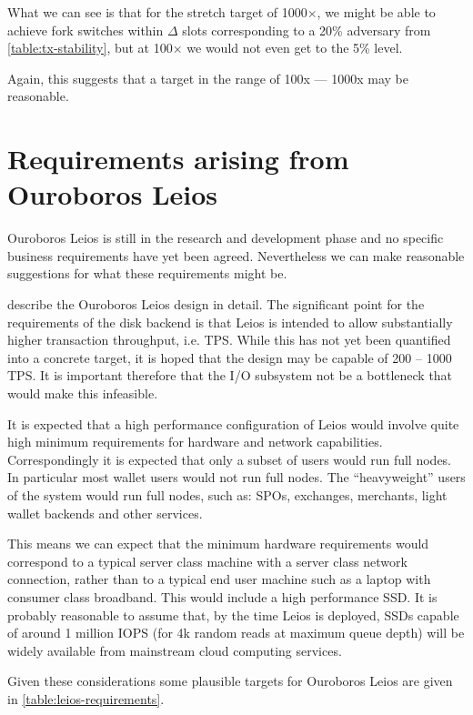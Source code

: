 \documentclass[11pt,a4paper]{article}
\begin{document}
What we can see is that for the stretch target of 1000$\times$, we might be
able to achieve fork switches within $\Delta$ slots corresponding to a 20\%
adversary from \cref{table:tx-stability}, but at 100$\times$ we would not even
get to the 5\% level.

Again, this suggests that a target in the range of 100x --- 1000x may be
reasonable.

\section{Requirements arising from Ouroboros Leios}
\label{sec:leios}

Ouroboros Leios is still in the research and development phase and no specific
business requirements have yet been agreed. Nevertheless we can make reasonable
suggestions for what these requirements might be.

\cite{leios} describe the Ouroboros Leios design in detail. The significant
point for the requirements of the disk backend is that Leios is intended to
allow substantially higher transaction throughput, i.e. TPS. While this has not
yet been quantified into a concrete target, it is hoped that the design may be
capable of 200 -- 1000 TPS. It is important therefore that the I/O subsystem
not be a bottleneck that would make this infeasible.

It is expected that a high performance configuration of Leios would involve
quite high minimum requirements for hardware and network capabilities.
Correspondingly it is expected that only a subset of users would run full nodes.
In particular most wallet users would not run full nodes. The ``heavyweight''
users of the system would run full nodes, such as: SPOs, exchanges, merchants,
light wallet backends and other services.

This means we can expect that the minimum hardware requirements would
correspond to a typical server class machine with a server class network
connection, rather than to a typical end user machine such as a laptop with
consumer class broadband. This would include a high performance SSD. It is
probably reasonable to assume that, by the time Leios is deployed, SSDs
capable of around 1 million IOPS (for 4k random reads at maximum queue depth)
will be widely available from mainstream cloud computing services.

Given these considerations some plausible targets for Ouroboros Leios are given
in \cref{table:leios-requirements}.
\end{document}
